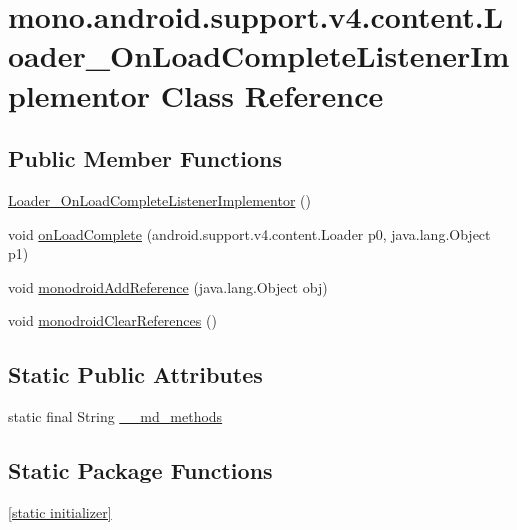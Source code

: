 \hypertarget{classmono_1_1android_1_1support_1_1v4_1_1content_1_1_loader___on_load_complete_listener_implementor}{
\section{mono.android.support.v4.content.Loader\_\-OnLoadCompleteListenerImplementor Class Reference}
\label{classmono_1_1android_1_1support_1_1v4_1_1content_1_1_loader___on_load_complete_listener_implementor}
}
\subsection*{Public Member Functions}
\begin{CompactItemize}
\item 
\hyperlink{classmono_1_1android_1_1support_1_1v4_1_1content_1_1_loader___on_load_complete_listener_implementor_4cb694bdb85dfb2ef045e418d37b82d0}{Loader\_\-OnLoadCompleteListenerImplementor} ()
\item 
void \hyperlink{classmono_1_1android_1_1support_1_1v4_1_1content_1_1_loader___on_load_complete_listener_implementor_9b4a8a9e279f40edd649d27a3078c7e0}{onLoadComplete} (android.support.v4.content.Loader p0, java.lang.Object p1)
\item 
void \hyperlink{classmono_1_1android_1_1support_1_1v4_1_1content_1_1_loader___on_load_complete_listener_implementor_3a4c9ef8ad15330e6de3d2665a8cc66e}{monodroidAddReference} (java.lang.Object obj)
\item 
void \hyperlink{classmono_1_1android_1_1support_1_1v4_1_1content_1_1_loader___on_load_complete_listener_implementor_da446ac79bc14bf9ee76ba6859226059}{monodroidClearReferences} ()
\end{CompactItemize}
\subsection*{Static Public Attributes}
\begin{CompactItemize}
\item 
static final String \hyperlink{classmono_1_1android_1_1support_1_1v4_1_1content_1_1_loader___on_load_complete_listener_implementor_c414db5d27d8036b3792eef1cc8344f8}{\_\-\_\-md\_\-methods}
\end{CompactItemize}
\subsection*{Static Package Functions}
\begin{CompactItemize}
\item 
\hyperlink{classmono_1_1android_1_1support_1_1v4_1_1content_1_1_loader___on_load_complete_listener_implementor_793716f43668792537ebc9729c9b1eee}{\mbox{[}static initializer\mbox{]}}
\end{CompactItemize}
